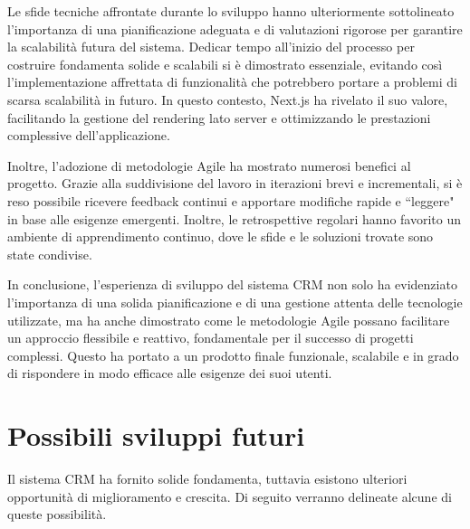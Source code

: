 \documentclass[target=bach,aauheader=,style=]{thud}
\begin{document}
\noindent Le sfide tecniche affrontate durante lo sviluppo hanno ulteriormente sottolineato l'importanza di una pianificazione adeguata e di valutazioni rigorose per garantire la scalabilità futura del sistema. Dedicar tempo all'inizio del processo per costruire fondamenta solide e scalabili si è dimostrato essenziale, evitando così l'implementazione affrettata di funzionalità che potrebbero portare a problemi di scarsa scalabilità in futuro. In questo contesto, Next.js ha rivelato il suo valore, facilitando la gestione del rendering lato server e ottimizzando le prestazioni complessive dell'applicazione.

\noindent Inoltre, l'adozione di metodologie Agile ha mostrato numerosi benefici al progetto. Grazie alla suddivisione del lavoro in iterazioni brevi e incrementali, si è reso possibile ricevere feedback continui e apportare modifiche rapide e ``leggere" in base alle esigenze emergenti. Inoltre, le retrospettive regolari hanno favorito un ambiente di apprendimento continuo, dove le sfide e le soluzioni trovate sono state condivise.

\noindent In conclusione, l'esperienza di sviluppo del sistema CRM non solo ha evidenziato l'importanza di una solida pianificazione e di una gestione attenta delle tecnologie utilizzate, ma ha anche dimostrato come le metodologie Agile possano facilitare un approccio flessibile e reattivo, fondamentale per il successo di progetti complessi. Questo ha portato a un prodotto finale funzionale, scalabile e in grado di rispondere in modo efficace alle esigenze dei suoi utenti.

\section{Possibili sviluppi futuri}
Il sistema CRM ha fornito solide fondamenta, tuttavia esistono ulteriori opportunità di miglioramento e crescita. Di seguito verranno delineate alcune di queste possibilità.
\end{document}
